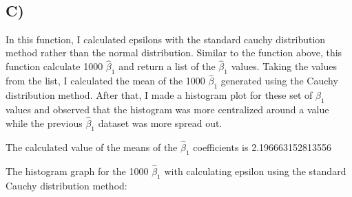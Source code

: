 \documentclass[11pt]{article}
\begin{document}
    \begin{center}
    \end{center}
    { \hspace*{\fill} \\}
    
    \hypertarget{c}{%
\subsection{C)}\label{c}}

    In this function, I calculated epsilons with the standard cauchy
distribution method rather than the normal distribution. Similar to the
function above, this function calculate 1000 \(\hat\beta_{1}\) and
return a list of the \(\hat\beta_{1}\) values. Taking the values from
the list, I calculated the mean of the 1000 \(\hat\beta_{1}\) generated
using the Cauchy distribution method. After that, I made a histogram
plot for these set of \(\hat\beta_{1}\) values and observed that the
histogram was more centralized around a value while the previous
\(\hat\beta_{1}\) dataset was more spread out.

    The calculated value of the means of the \(\hat\beta_{1}\) coefficients
is 2.196663152813556

    The histogram graph for the 1000 \(\hat\beta_{1}\) with calculating
epsilon using the standard Cauchy distribution method:
\end{document}
